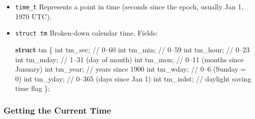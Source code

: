 \documentclass[
  letterpaper,
  DIV=11,
  numbers=noendperiod]{scrreprt}
\newenvironment{Shaded}{\begin{snugshade}}{\end{snugshade}}
\newcommand{\CommentTok}[1]{\textcolor[rgb]{0.37,0.37,0.37}{#1}}
\newcommand{\DataTypeTok}[1]{\textcolor[rgb]{0.68,0.00,0.00}{#1}}
\newcommand{\KeywordTok}[1]{\textcolor[rgb]{0.00,0.23,0.31}{\textbf{#1}}}
\newcommand{\NormalTok}[1]{\textcolor[rgb]{0.00,0.23,0.31}{#1}}
\newcommand{\OperatorTok}[1]{\textcolor[rgb]{0.37,0.37,0.37}{#1}}
\begin{document}
\begin{itemize}
\item
  \texttt{time\_t} Represents a point in time (seconds since the epoch,
  usually Jan 1, 1970 UTC).
\item
  \texttt{struct\ tm} Broken-down calendar time. Fields:

\begin{Shaded}
\begin{Highlighting}[]
\KeywordTok{struct}\NormalTok{ tm }\OperatorTok{\{}
    \DataTypeTok{int}\NormalTok{ tm\_sec}\OperatorTok{;}   \CommentTok{// 0–60}
    \DataTypeTok{int}\NormalTok{ tm\_min}\OperatorTok{;}   \CommentTok{// 0–59}
    \DataTypeTok{int}\NormalTok{ tm\_hour}\OperatorTok{;}  \CommentTok{// 0–23}
    \DataTypeTok{int}\NormalTok{ tm\_mday}\OperatorTok{;}  \CommentTok{// 1–31 (day of month)}
    \DataTypeTok{int}\NormalTok{ tm\_mon}\OperatorTok{;}   \CommentTok{// 0–11 (months since January)}
    \DataTypeTok{int}\NormalTok{ tm\_year}\OperatorTok{;}  \CommentTok{// years since 1900}
    \DataTypeTok{int}\NormalTok{ tm\_wday}\OperatorTok{;}  \CommentTok{// 0–6 (Sunday = 0)}
    \DataTypeTok{int}\NormalTok{ tm\_yday}\OperatorTok{;}  \CommentTok{// 0–365 (days since Jan 1)}
    \DataTypeTok{int}\NormalTok{ tm\_isdst}\OperatorTok{;} \CommentTok{// daylight saving time flag}
\OperatorTok{\};}
\end{Highlighting}
\end{Shaded}
\end{itemize}

\subsubsection{Getting the Current Time}\label{getting-the-current-time}
\end{document}
